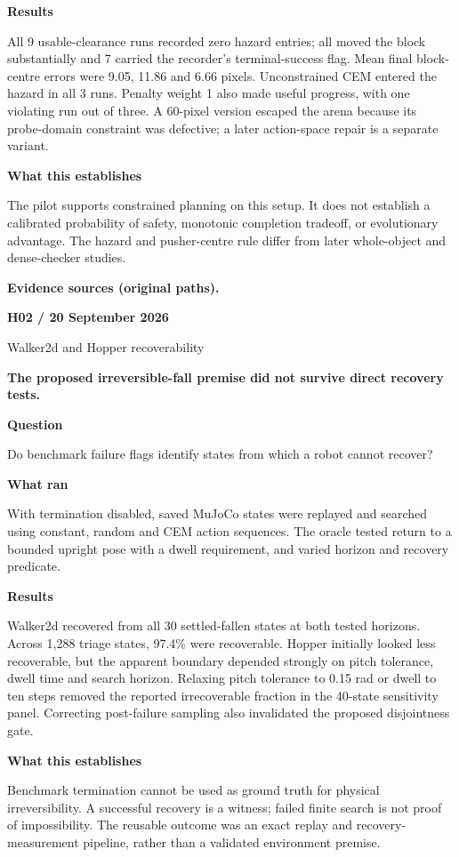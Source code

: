 \documentclass[11pt,a4paper]{article}
\newcommand{\block}[2]{\par\textbf{\color{ink}#1}\par\nopagebreak #2\par}
\newcommand{\finding}[1]{\begin{tcolorbox}[colback=pale,colframe=pale,boxrule=0pt,arc=1mm,left=10pt,right=10pt,top=10pt,bottom=10pt]\color{ink}\large\bfseries #1\end{tcolorbox}}
\begin{document}
\block{Results}{All 9 usable-clearance runs recorded zero hazard entries; all moved the block substantially and 7 carried the recorder's terminal-success flag. Mean final block-centre errors were 9.05, 11.86 and 6.66 pixels. Unconstrained CEM entered the hazard in all 3 runs. Penalty weight 1 also made useful progress, with one violating run out of three. A 60-pixel version escaped the arena because its probe-domain constraint was defective; a later action-space repair is a separate variant.}
\block{What this establishes}{The pilot supports constrained planning on this setup. It does not establish a calibrated probability of safety, monotonic completion tradeoff, or evolutionary advantage. The hazard and pusher-centre rule differ from later whole-object and dense-checker studies.}
\vfill{\footnotesize\color{muted}\textbf{Evidence sources (original paths).}\par
\raggedright {}\par {}}
\clearpage
{}\label{exp:H02}
{\color{accent}\small\bfseries H02 / 20 September 2026}\par
{}\par
{\color{muted}\small Walker2d and Hopper recoverability}\par\vspace{2mm}
\finding{The proposed irreversible-fall premise did not survive direct recovery tests.}
\block{Question}{Do benchmark failure flags identify states from which a robot cannot recover?}
\block{What ran}{With termination disabled, saved MuJoCo states were replayed and searched using constant, random and CEM action sequences. The oracle tested return to a bounded upright pose with a dwell requirement, and varied horizon and recovery predicate.}
\block{Results}{Walker2d recovered from all 30 settled-fallen states at both tested horizons. Across 1,288 triage states, 97.4\% were recoverable. Hopper initially looked less recoverable, but the apparent boundary depended strongly on pitch tolerance, dwell time and search horizon. Relaxing pitch tolerance to 0.15 rad or dwell to ten steps removed the reported irrecoverable fraction in the 40-state sensitivity panel. Correcting post-failure sampling also invalidated the proposed disjointness gate.}
\block{What this establishes}{Benchmark termination cannot be used as ground truth for physical irreversibility. A successful recovery is a witness; failed finite search is not proof of impossibility. The reusable outcome was an exact replay and recovery-measurement pipeline, rather than a validated environment premise.}
\end{document}
